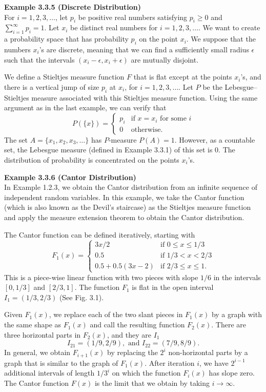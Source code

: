 \textbf{Example 3.3.5 (Discrete Distribution)} \\
For $i = 1, 2, 3, \dots$, let $p_i$ be positive real numbers satisfying $p_i \ge 0$ and $\sum_{i=1}^\infty p_i = 1$. Let $x_i$ be distinct real numbers for $i = 1, 2, 3, \dots$. We want to create a probability space that has probability $p_i$ on the point $x_i$. We suppose that the numbers $x_i$'s are discrete, meaning that we can find a sufficiently small radius $\epsilon$ such that the intervals $(x_i - \epsilon, x_i + \epsilon)$ are mutually disjoint.

We define a Stieltjes measure function $F$ that is flat except at the points $x_i$'s, and there is a vertical jump of size $p_i$ at $x_i$, for $i = 1, 2, 3, \dots$. Let $P$ be the Lebesgue--Stieltjes measure associated with this Stieltjes measure function. Using the same argument as in the last example, we can verify that
\[
P(\{x\}) = \begin{cases} 
p_i & \text{if } x = x_i \text{ for some } i \\ 
0 & \text{otherwise.} 
\end{cases}
\]
The set $A = \{x_1, x_2, x_3, \dots\}$ has $P$-measure $P(A) = 1$. However, as a countable set, the Lebesgue measure (defined in Example 3.3.1) of this set is 0. The distribution of probability is concentrated on the points $x_i$'s.

\textbf{Example 3.3.6 (Cantor Distribution)} \\
In Example 1.2.3, we obtain the Cantor distribution from an infinite sequence of independent random variables. In this example, we take the Cantor function (which is also known as the Devil's staircase) as the Stieltjes measure function and apply the measure extension theorem to obtain the Cantor distribution.

The Cantor function can be defined iteratively, starting with
\[
F_1(x) = \begin{cases} 
3x/2 & \text{if } 0 \le x \le 1/3 \\ 
0.5 & \text{if } 1/3 < x < 2/3 \\ 
0.5 + 0.5(3x - 2) & \text{if } 2/3 \le x \le 1. 
\end{cases}
\]
This is a piece-wise linear function with two pieces with slope $1/6$ in the intervals $[0, 1/3]$ and $[2/3, 1]$. The function $F_1$ is flat in the open interval $I_1 = (1/3, 2/3)$ (See Fig. 3.1).

Given $F_1(x)$, we replace each of the two slant pieces in $F_1(x)$ by a graph with the same shape as $F_1(x)$ and call the resulting function $F_2(x)$. There are three horizontal parts in $F_2(x)$, and they are $I_1$
\[
I_{21} = (1/9, 2/9), \text{ and } I_{22} = (7/9, 8/9).
\]
In general, we obtain $F_{i+1}(x)$ by replacing the $2^i$ non-horizontal parts by a graph that is similar to the graph of $F_1(x)$. After iteration $i$, we have $2^{i-1}$ additional intervals of length $1/3^i$ on which the function $F_i(x)$ has slope zero. The Cantor function $F(x)$ is the limit that we obtain by taking $i \to \infty$.

